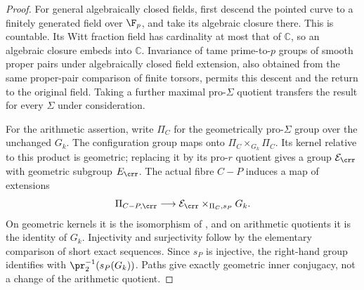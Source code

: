 \begin{proof}
For general algebraically closed fields, first descend the pointed
curve to a finitely generated field over $\F_p$, and take its
algebraic closure there. This is countable. Its Witt fraction field has
cardinality at most that of $\mathbb C$, so an algebraic closure
embeds into $\mathbb C$. Invariance of tame prime-to-$p$ groups of
smooth proper pairs under algebraically closed field extension, also
obtained from the same proper-pair comparison of finite torsors,
permits this descent and the return to the original field. Taking a
further maximal pro-$\Sigma$ quotient transfers the result for every
$\Sigma$ under consideration.

For the arithmetic assertion, write $\Pi_C$ for the geometrically
pro-$\Sigma$ group over the unchanged $G_k$. The configuration group
maps onto $\Pi_C\times_{G_k}\Pi_C$. Its kernel relative to this
product is geometric; replacing it by its pro-$r$ quotient gives a
group $\mathcal E_{\crr}$ with geometric subgroup $E_{\crr}$.
The actual fibre $C-P$ induces a map of extensions
\[
 \Pi_{C-P,\crr}\longrightarrow
 \mathcal E_{\crr}\times_{\Pi_C,s_P}G_k.
\]
On geometric kernels it is the isomorphism of
, and on arithmetic quotients it is the identity
of $G_k$. Injectivity and surjectivity follow by the elementary
comparison of short exact sequences. Since $s_P$ is injective, the
right-hand group identifies with $\pr_2^{-1}(s_P(G_k))$.
Paths give exactly geometric inner conjugacy, not a change of the
arithmetic quotient.
\end{proof}

